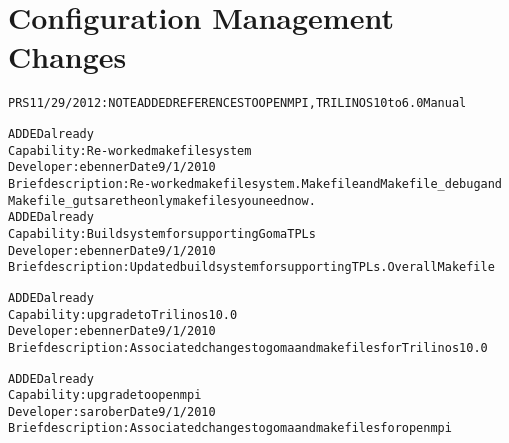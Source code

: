 \documentclass{article}
\begin{document}
\section{Configuration Management Changes}
\begin{alltt}

PRS 11/29/2012: NOTE ADDED REFERENCES TO OPENMPI, TRILINOS 10 to 6.0 Manual

ADDED already
Capability: Re-worked makefile system
Developer: ebenner  Date 9/1/2010 
Brief description: Re-worked makefile system.  Makefile and Makefile_debug and 
  Makefile_guts are the only makefiles you need now. 
ADDED already
Capability: Build system for supporting Goma TPLs
Developer: ebenner  Date 9/1/2010 
Brief description:  Updated build system for supporting TPLs.   Overall Makefile

ADDED already
Capability: upgrade to Trilinos 10.0
Developer: ebenner  Date 9/1/2010 
Brief description:  Associated changes to goma and makefiles for Trilinos 10.0

ADDED already
Capability: upgrade to openmpi
Developer: sarober  Date 9/1/2010 
Brief description:  Associated changes to goma and makefiles for openmpi

\end{alltt}
\end{document}
